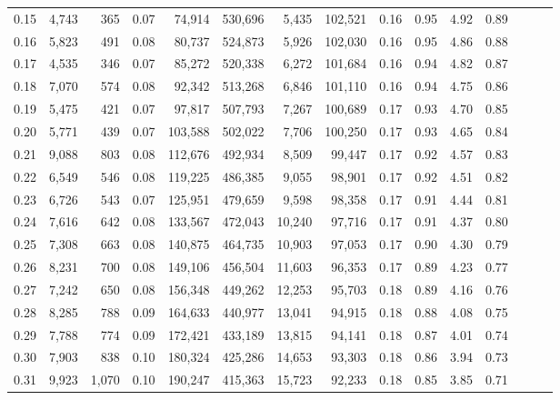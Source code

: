 \begin{tabular}{rrrrrrrrrrrrrrr}
0.15 &   4,743 &    365 &  0.07 &   74,914 &  530,696 &    5,435 &  102,521 &  0.16 &  0.95 &  4.92 &      0.89 \\
0.16 &   5,823 &    491 &  0.08 &   80,737 &  524,873 &    5,926 &  102,030 &  0.16 &  0.95 &  4.86 &      0.88 \\
0.17 &   4,535 &    346 &  0.07 &   85,272 &  520,338 &    6,272 &  101,684 &  0.16 &  0.94 &  4.82 &      0.87 \\
0.18 &   7,070 &    574 &  0.08 &   92,342 &  513,268 &    6,846 &  101,110 &  0.16 &  0.94 &  4.75 &      0.86 \\
0.19 &   5,475 &    421 &  0.07 &   97,817 &  507,793 &    7,267 &  100,689 &  0.17 &  0.93 &  4.70 &      0.85 \\
0.20 &   5,771 &    439 &  0.07 &  103,588 &  502,022 &    7,706 &  100,250 &  0.17 &  0.93 &  4.65 &      0.84 \\
0.21 &   9,088 &    803 &  0.08 &  112,676 &  492,934 &    8,509 &   99,447 &  0.17 &  0.92 &  4.57 &      0.83 \\
0.22 &   6,549 &    546 &  0.08 &  119,225 &  486,385 &    9,055 &   98,901 &  0.17 &  0.92 &  4.51 &      0.82 \\
0.23 &   6,726 &    543 &  0.07 &  125,951 &  479,659 &    9,598 &   98,358 &  0.17 &  0.91 &  4.44 &      0.81 \\
0.24 &   7,616 &    642 &  0.08 &  133,567 &  472,043 &   10,240 &   97,716 &  0.17 &  0.91 &  4.37 &      0.80 \\
0.25 &   7,308 &    663 &  0.08 &  140,875 &  464,735 &   10,903 &   97,053 &  0.17 &  0.90 &  4.30 &      0.79 \\
0.26 &   8,231 &    700 &  0.08 &  149,106 &  456,504 &   11,603 &   96,353 &  0.17 &  0.89 &  4.23 &      0.77 \\
0.27 &   7,242 &    650 &  0.08 &  156,348 &  449,262 &   12,253 &   95,703 &  0.18 &  0.89 &  4.16 &      0.76 \\
0.28 &   8,285 &    788 &  0.09 &  164,633 &  440,977 &   13,041 &   94,915 &  0.18 &  0.88 &  4.08 &      0.75 \\
0.29 &   7,788 &    774 &  0.09 &  172,421 &  433,189 &   13,815 &   94,141 &  0.18 &  0.87 &  4.01 &      0.74 \\
0.30 &   7,903 &    838 &  0.10 &  180,324 &  425,286 &   14,653 &   93,303 &  0.18 &  0.86 &  3.94 &      0.73 \\
0.31 &   9,923 &  1,070 &  0.10 &  190,247 &  415,363 &   15,723 &   92,233 &  0.18 &  0.85 &  3.85 &      0.71 \\

\end{tabular}
